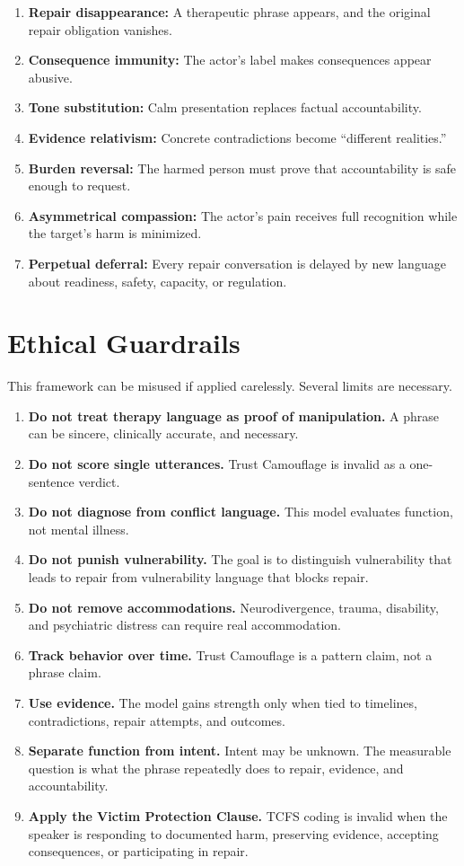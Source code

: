\documentclass[11pt, letterpaper]{article}
\newcommand{\term}[1]{\textbf{#1}}
\begin{document}
\begin{enumerate}
    \item \term{Repair disappearance:} A therapeutic phrase appears, and the original repair obligation vanishes.
    \item \term{Consequence immunity:} The actor's label makes consequences appear abusive.
    \item \term{Tone substitution:} Calm presentation replaces factual accountability.
    \item \term{Evidence relativism:} Concrete contradictions become ``different realities.''
    \item \term{Burden reversal:} The harmed person must prove that accountability is safe enough to request.
    \item \term{Asymmetrical compassion:} The actor's pain receives full recognition while the target's harm is minimized.
    \item \term{Perpetual deferral:} Every repair conversation is delayed by new language about readiness, safety, capacity, or regulation.
\end{enumerate}

\section{Ethical Guardrails}

This framework can be misused if applied carelessly. Several limits are necessary.

\begin{enumerate}
    \item \term{Do not treat therapy language as proof of manipulation.} A phrase can be sincere, clinically accurate, and necessary.
    \item \term{Do not score single utterances.} Trust Camouflage is invalid as a one-sentence verdict.
    \item \term{Do not diagnose from conflict language.} This model evaluates function, not mental illness.
    \item \term{Do not punish vulnerability.} The goal is to distinguish vulnerability that leads to repair from vulnerability language that blocks repair.
    \item \term{Do not remove accommodations.} Neurodivergence, trauma, disability, and psychiatric distress can require real accommodation.
    \item \term{Track behavior over time.} Trust Camouflage is a pattern claim, not a phrase claim.
    \item \term{Use evidence.} The model gains strength only when tied to timelines, contradictions, repair attempts, and outcomes.
    \item \term{Separate function from intent.} Intent may be unknown. The measurable question is what the phrase repeatedly does to repair, evidence, and accountability.
    \item \term{Apply the Victim Protection Clause.} TCFS coding is invalid when the speaker is responding to documented harm, preserving evidence, accepting consequences, or participating in repair.
\end{enumerate}
\end{document}
